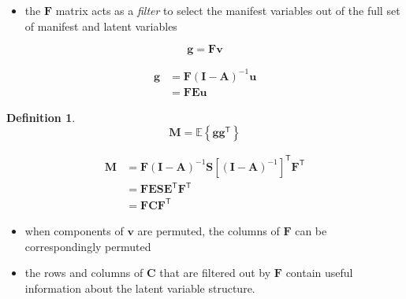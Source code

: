 \documentclass[
]{book}
\providecommand{\tightlist}{%
  \setlength{\itemsep}{0pt}\setlength{\parskip}{0pt}}
\theoremstyle{definition}
\newtheorem{definition}{Definition}[chapter]
\theoremstyle{definition}
\theoremstyle{definition}
\theoremstyle{remark}
\begin{document}
\begin{itemize}
\tightlist
\item
  the \(\mathbf{F}\) matrix acts as a \emph{filter} to select the manifest variables
  out of the full set of manifest and latent variables
\end{itemize}

\begin{equation}
  \mathbf{g}
  =
  \mathbf{F}
  \mathbf{v}
\end{equation}

\begin{equation}
  \begin{split}
    \mathbf{g}
    &=
    \mathbf{F} \left( \mathbf{I} - \mathbf{A} \right)^{-1} \mathbf{u} \\
    &=
    \mathbf{F} \mathbf{E} \mathbf{u}
  \end{split}
\end{equation}

\begin{definition}
\protect\hypertarget{def:unnamed-chunk-8}{}{\label{def:unnamed-chunk-8} }\begin{equation}
  \mathbf{M}
  =
  \mathbb{E}
  \left\{
    \mathbf{g}
    \mathbf{g}^{\mathsf{T}}
  \right\}
\end{equation}
\end{definition}

\begin{equation}
  \begin{split}
    \mathbf{M}
    &=
    \mathbf{F}
    \left( \mathbf{I} - \mathbf{A} \right)^{-1}
    \mathbf{S}
    \left[ \left( \mathbf{I} - \mathbf{A} \right)^{-1} \right]^{\mathsf{T}}
    \mathbf{F}^{\mathsf{T}} \\
    &=
    \mathbf{F}
    \mathbf{E} \mathbf{S} \mathbf{E}^{\mathsf{T}}
    \mathbf{F}^{\mathsf{T}} \\
    &=
    \mathbf{F}
    \mathbf{C}
    \mathbf{F}^{\mathsf{T}}
  \end{split}
\end{equation}

\begin{itemize}
\tightlist
\item
  when components of \(\mathbf{v}\) are permuted,
  the columns of \(\mathbf{F}\) can be correspondingly permuted
\item
  the rows and columns of \(\mathbf{C}\) that are filtered out by \(\mathbf{F}\)
  contain useful information about the latent variable structure.
\end{itemize}
\end{document}
